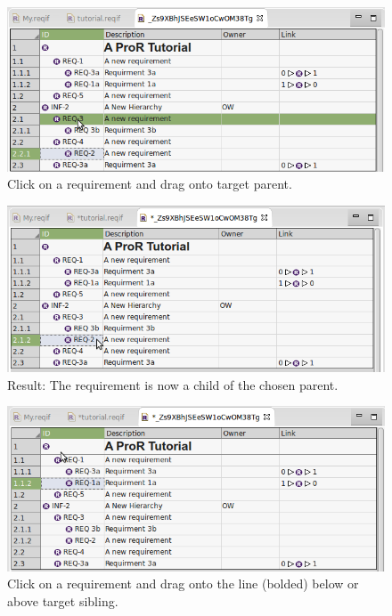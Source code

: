{{{\begin{figure}[!h]
  \centering
  \includegraphics[width=\linewidth]{../rmf-images/hierarchy_step_1.png}
  \caption{Click on a requirement and drag onto target parent.}
  \label{fig:hierarchy_step_1}
\end{figure}
\begin{figure}[!h]
  \centering
  \includegraphics[width=\linewidth]{../rmf-images/hierarchy_step_2.png}
  \caption{Result: The requirement is now a child of the chosen parent.}
  \label{fig:hierarchy_step_2}
\end{figure}
\begin{figure}[!h]
  \centering
  \includegraphics[width=\linewidth]{../rmf-images/hierarchy_step_3.png}
  \caption{Click on a requirement and drag onto the line (bolded) below or above target sibling.}
  \label{fig:hierarchy_step_3}

\end{figure}}}}
